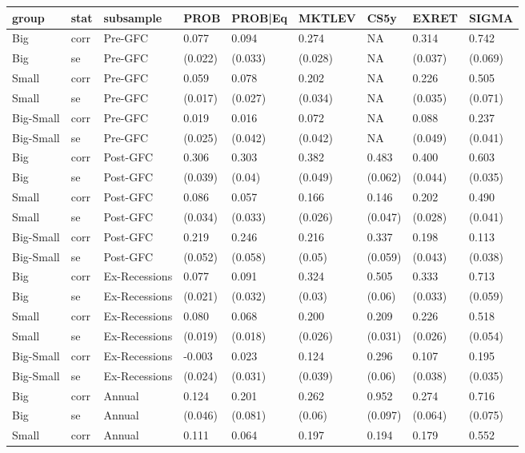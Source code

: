
\begin{tabular}{l|l|l|l|l|l|l|l|l}
\hline
group & stat & subsample & PROB & PROB|Eq & MKTLEV & CS5y & EXRET & SIGMA\\
\hline
Big & corr & Pre-GFC & 0.077 & 0.094 & 0.274 & NA & 0.314 & 0.742\\
Big & se & Pre-GFC & (0.022) & (0.033) & (0.028) & NA & (0.037) & (0.069)\\
Small & corr & Pre-GFC & 0.059 & 0.078 & 0.202 & NA & 0.226 & 0.505\\
Small & se & Pre-GFC & (0.017) & (0.027) & (0.034) & NA & (0.035) & (0.071)\\
Big-Small & corr & Pre-GFC & 0.019 & 0.016 & 0.072 & NA & 0.088 & 0.237\\
Big-Small & se & Pre-GFC & (0.025) & (0.042) & (0.042) & NA & (0.049) & (0.041)\\
Big & corr & Post-GFC & 0.306 & 0.303 & 0.382 & 0.483 & 0.400 & 0.603\\
Big & se & Post-GFC & (0.039) & (0.04) & (0.049) & (0.062) & (0.044) & (0.035)\\
Small & corr & Post-GFC & 0.086 & 0.057 & 0.166 & 0.146 & 0.202 & 0.490\\
Small & se & Post-GFC & (0.034) & (0.033) & (0.026) & (0.047) & (0.028) & (0.041)\\
Big-Small & corr & Post-GFC & 0.219 & 0.246 & 0.216 & 0.337 & 0.198 & 0.113\\
Big-Small & se & Post-GFC & (0.052) & (0.058) & (0.05) & (0.059) & (0.043) & (0.038)\\
Big & corr & Ex-Recessions & 0.077 & 0.091 & 0.324 & 0.505 & 0.333 & 0.713\\
Big & se & Ex-Recessions & (0.021) & (0.032) & (0.03) & (0.06) & (0.033) & (0.059)\\
Small & corr & Ex-Recessions & 0.080 & 0.068 & 0.200 & 0.209 & 0.226 & 0.518\\
Small & se & Ex-Recessions & (0.019) & (0.018) & (0.026) & (0.031) & (0.026) & (0.054)\\
Big-Small & corr & Ex-Recessions & -0.003 & 0.023 & 0.124 & 0.296 & 0.107 & 0.195\\
Big-Small & se & Ex-Recessions & (0.024) & (0.031) & (0.039) & (0.06) & (0.038) & (0.035)\\
Big & corr & Annual & 0.124 & 0.201 & 0.262 & 0.952 & 0.274 & 0.716\\
Big & se & Annual & (0.046) & (0.081) & (0.06) & (0.097) & (0.064) & (0.075)\\
Small & corr & Annual & 0.111 & 0.064 & 0.197 & 0.194 & 0.179 & 0.552\\

\end{tabular}
